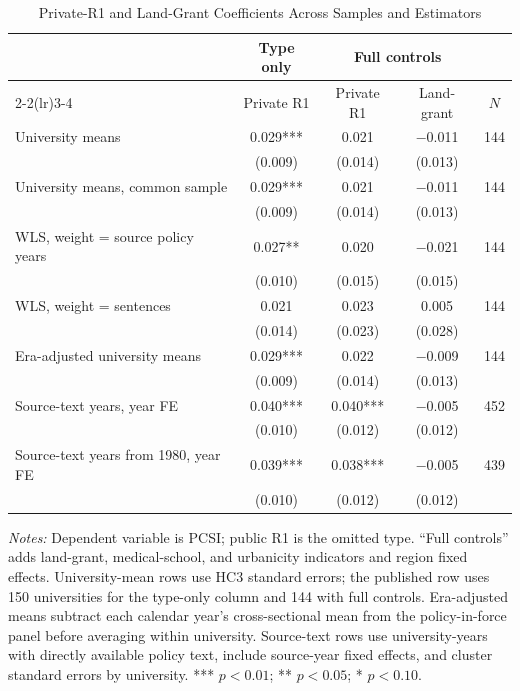 \begin{table}[htbp]
\centering
\small
\caption{Private-R1 and Land-Grant Coefficients Across Samples and Estimators}
\label{tab:inst-robust}
\begin{threeparttable}
\begin{tabular}{lcccc}
\toprule
 & Type only & \multicolumn{2}{c}{Full controls} & \\
\cmidrule(lr){2-2}\cmidrule(lr){3-4}
 & Private R1 & Private R1 & Land-grant & $N$ \\
\midrule
University means & 0.029*** & 0.021 & $-$0.011 & 144 \\
 & (0.009) & (0.014) & (0.013) & \\
University means, common sample & 0.029*** & 0.021 & $-$0.011 & 144 \\
 & (0.009) & (0.014) & (0.013) & \\
WLS, weight = source policy years & 0.027** & 0.020 & $-$0.021 & 144 \\
 & (0.010) & (0.015) & (0.015) & \\
WLS, weight = sentences & 0.021 & 0.023 & 0.005 & 144 \\
 & (0.014) & (0.023) & (0.028) & \\
Era-adjusted university means & 0.029*** & 0.022 & $-$0.009 & 144 \\
 & (0.009) & (0.014) & (0.013) & \\
Source-text years, year FE & 0.040*** & 0.040*** & $-$0.005 & 452 \\
 & (0.010) & (0.012) & (0.012) & \\
Source-text years from 1980, year FE & 0.039*** & 0.038*** & $-$0.005 & 439 \\
 & (0.010) & (0.012) & (0.012) & \\
\bottomrule
\end{tabular}
\begin{tablenotes}[flushleft]\footnotesize
\item \textit{Notes:} Dependent variable is PCSI; public R1 is the omitted type. ``Full controls'' adds land-grant, medical-school, and urbanicity indicators and region fixed effects. University-mean rows use HC3 standard errors; the published row uses 150 universities for the type-only column and 144 with full controls. Era-adjusted means subtract each calendar year's cross-sectional mean from the policy-in-force panel before averaging within university. Source-text rows use university-years with directly available policy text, include source-year fixed effects, and cluster standard errors by university. *** $p<0.01$; ** $p<0.05$; * $p<0.10$.
\end{tablenotes}
\end{threeparttable}
\end{table}
